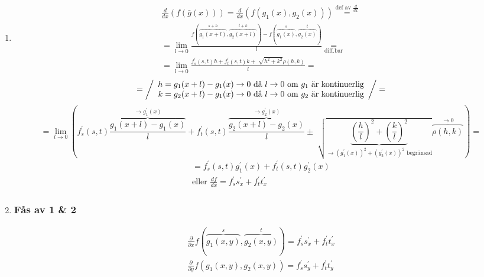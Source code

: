 \documentclass{article}
\let\oldsqrt\sqrt
\renewcommand*{\sqrt}[2][\ ]{\oldsqrt[#1]{#2} }
\begin{document}
\begin{enumerate}
	\newpage
	\item
	\[
	\begin{split}
		\frac{d}{dx}(f(\bar{g}(x))) = \frac{d}{dx}(f(g_{1}(x),g_{2}(x))) \overset{\text{def av }\frac{d}{dx}}{=} \\
		= \lim_{l \rightarrow 0} \frac{f(\overbrace{g_{1}(x+l)}^{s+h},\overbrace{g_{2}(x+l)}^{t+k}) - 
		f(\overbrace{g_{1}(x)}^{s},\overbrace{g_{2}(x)}^{t})}{l} \underset{\text{diff.bar}}{=} \\
		= \lim_{l \rightarrow 0} \frac{f_{s}^{\prime}(s,t)h+f_{t}^{\prime}(s,t)k+\sqrt{h^2+k^2}\rho(h,k)}{l} = 
	\end{split}
	\]
	\[
		= \left/ \begin{array}{rcl}
			h=g_{1}(x+l)-g_{1}(x) \rightarrow 0 \text{ då } l \rightarrow 0 \text{ om \(g_{1}\) är kontinuerlig} \\
			k=g_{2}(x+l)-g_{1}(x) \rightarrow 0 \text{ då } l \rightarrow 0 \text{ om \(g_{2}\) är kontinuerlig}
		\end{array}\right/ =
	\]
	\[
		= \lim_{l \rightarrow 0} \left(
		 f_{s}^{\prime}(s,t)\overbrace{\frac{g_{1}(x+l)-g_{1}(x)}{l}}^{\rightarrow g_{1}^{\prime}(x)}+
		 f_{t}^{\prime}(s,t)\overbrace{\frac{g_{2}(x+l)-g_{2}(x)}{l}}^{\rightarrow g_{2}^{\prime}(x)}\pm
		 \sqrt{\underbrace{\left(\frac{h}{l}\right)^2+\left(\frac{k}{l}\right)^2}
		 _{\rightarrow (g_{1}^{\prime}(x))^2+(g_{2}^{\prime}(x))^2 \text{ begränsad}}}
		 \overbrace{\rho(h,k)}^{\rightarrow 0} 
		\right) =
	\]
	\[
	\begin{split}
		= f_{s}^{\prime}(s,t)g_{1}^{\prime}(x) + f_{t}^{\prime}(s,t)g_{2}^{\prime}(x) \\
		\text{eller } \frac{df}{dx} = f_{s}^{\prime}s_{x}^{\prime} + f_{t}^{\prime}t_{x}^{\prime}
	\end{split}
	\]
	\item \subsubsection*{Fås av 1 \& 2}
	\[
	\begin{split}
		\frac{\partial}{\partial x}f(\overbrace{g_{1}(x,y)}^{s},\overbrace{g_{2}(x,y)}^{t}) = f_{s}^{\prime}s_{x}^{\prime} +
		f_{t}^{\prime}t_{x}^{\prime} \\
		\frac{\partial}{\partial y}f(g_{1}(x,y),g_{2}(x,y)) = f_{s}^{\prime}s_{y}^{\prime} + f_{t}^{\prime}t_{y}^{\prime}
	\end{split}
	\]

\end{enumerate}
\end{document}
